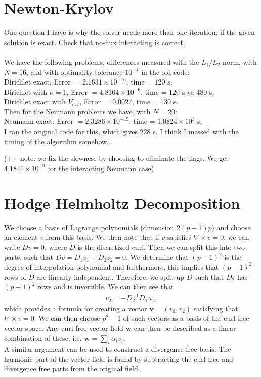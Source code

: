 \documentclass[11pt, a4paper]{article}
\theoremstyle{definition}
\begin{document}
	
\section{Newton-Krylov }

	One question I have is why the solver needs more than one iteration, if the given solution is exact.
Check that no-flux interacting is correct.\\
\\
We have the following problems, differences measured with the $L_1/L_2$ norm, with $N = 16$, and with optimality tolerance $10^{-4}$ in the old code:\\
Dirichlet exact, Error $= 2.1631 \times 10^{-16}$, time = $ 120$ s,\\
Dirichlet with $\kappa =1$, Error $= 4.8164 \times 10^{-6}$, time = $120 $ s va $480$ s,\\
Dirichlet exact with $V_{ext}$, Error $= 0.0027$, time = $ 130$ s.\\
Then for the Neumann problems we have, with $N = 20$:\\
Neumann exact, Error $= 2.3286 \times 10^{-15}$, time = $1.0824 \times 10^3 $ s,\\ I ran the original code for this, which gives $228$ s.
I think I messed with the timing of the algorithm somehow... 

(++ note: we fix the slowness by choosing to eliminate the flags. We get $4.1841 \times 10^{-9}$ for the interacting Neumann case)

\section{Hodge Helmholtz Decomposition}
We choose a basis of Lagrange polynomials (dimension $2(p-1)p$) and choose an element $v$ from this basis. 
We then note that if $v$ satisfies $\nabla \times v = 0$, we can write $Dv =0$, where $D$ is the discretized curl. Then we can split this into two parts, such that $Dv = D_1 v_1 + D_2 v_2 =0$. We determine that $(p-1)^2$ is the degree of interpolation	polynomial and furthermore, this implies that $(p -1)^2$ rows of $D$ are linearly independent. Therefore, we split up $D$ such that $D_2$ has $(p -1)^2$ rows and is invertible. We can then see that 
\begin{align*}
	v_2 = -D_2^{-1} D_1 u_1,
\end{align*}
which provides a formula for creating a vector $\mathbf v = (v_1, v_2)$ satisfying that $\nabla \times v = 0$.
We can then choose $p^2 -1$ of such vectors as a basis of the curl free vector space.
Any curl free vector field $\mathbf w$ can then be described as a linear combination of these, i.e. $\mathbf w = \sum_i \alpha_i v_i$.\\
A similar argument can be used to construct a divergence free basis. The harmonic part of the vector field is found by subtracting the curl free and divergence free parts from the original field.
\end{document}
